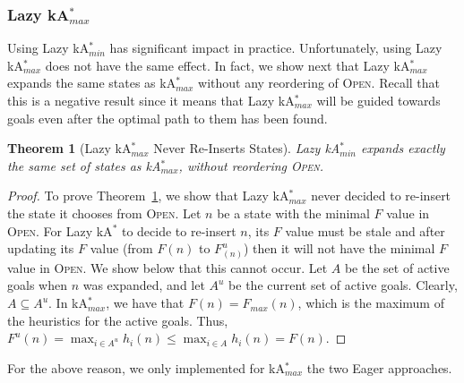 \documentclass{aicom2e}
\newtheorem{theorem}{Theorem}
\newcommand{\kastar}{kA$^*$}
\newcommand{\kastarmin}{kA$^*_{min}$}
\newcommand{\kastarmax}{kA$^*_{max}$}
\newcommand{\maxf}{$F_{max}(n)$}
\newcommand{\open}{\textsc{Open}}
\begin{document}
\subsubsection{Lazy \kastarmax{}}
Using Lazy \kastarmin{} has significant impact in practice. 
Unfortunately, using Lazy \kastarmax{} does not have the same effect. In fact, 
we show next that Lazy \kastarmax{} expands the same states as \kastarmax{} without any reordering of \open{}. Recall that this is a negative result since it means that Lazy \kastarmax{} will be guided towards goals even after the optimal path to them has been found. %
\begin{theorem}[Lazy \kastarmax{} Never Re-Inserts States]
Lazy \kastarmin{} expands exactly the same set of states as \kastarmax{}, 
without reordering \open{}. 
	\label{the:lazy-maxf-bad}
\end{theorem}
\begin{proof}
	To prove Theorem~\ref{the:lazy-maxf-bad}, we show that Lazy \kastarmax{} never decided to re-insert the state it chooses from \open{}. Let $n$ be a state with the minimal $F$ value in \open. 
	For Lazy \kastar{} to decide to re-insert $n$, 	its $F$ value must be stale and after updating its $F$ value 
	(from $F(n)$ to $F^u_(n)$) then it will not have  the minimal $F$ value in \open{}. 
	We show below that this cannot occur. 
	Let $A$ be the set of active goals when 
	$n$ was expanded, and let $A^u$ be the current set of active goals. Clearly, $A\subseteq A^u$. 
	In \kastarmax{}, we have that $F(n)=$\maxf{}, which is the maximum of the heuristics for the active goals. 
	Thus, $F^u(n)=\max_{i\in A^u} h_i(n)\leq \max_{i\in A} h_i(n) = F(n)$.
\end{proof}

For the above reason, we only implemented for \kastarmax{} the two Eager approaches.
\end{document}
